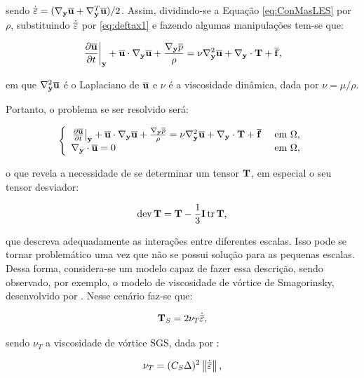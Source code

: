 \documentclass[_ArquivoPrincipal.tex]{subfiles}
\begin{document}
\noindent sendo $\dot{\overline{\mathbf{\varepsilon}}}=(\mathbf{\nabla_y}\overline{\mathbf{u}}+\mathbf{\nabla}^T_\mathbf{y}\overline{\mathbf{u}})/2$. Assim, dividindo-se a Equação \ref{eq:ConMasLES} por $\rho$, substituindo $\dot{\overline{\mathbf{\varepsilon}}}$ por \ref{eq:deftax1} e fazendo algumas manipulações tem-se que:

\begin{equation}
    \left.\frac{\partial{\overline{\mathbf{u}}}}{\partial{t}}\right|_{\mathbf{y}}+\overline{\mathbf{u}}\cdot\mathbf{\nabla_y}\overline{\mathbf{u}}+\frac{\mathbf{\nabla_y} \overline{p}}{\rho}=\nu\mathbf{\nabla}^2_\mathbf{y}\overline{\mathbf{u}}+\mathbf{\nabla_y}\cdot\mathbf{T}+\overline{\mathbf{f}}\text{,}
\end{equation}

\noindent em que $\mathbf{\nabla}^2_\mathbf{y}\overline{\mathbf{u}}$ é o Laplaciano de $\overline{\mathbf{u}}$ e $\nu$ é a viscosidade dinâmica, dada por $\nu=\mu/\rho$.

Portanto, o problema se ser resolvido será:

\begin{equation}
    \left\{
   \begin{array}{ll}
        \left.\frac{\partial{\overline{\mathbf{u}}}}{\partial{t}}\right|_{\mathbf{y}}+\overline{\mathbf{u}}\cdot\mathbf{\nabla_y}\overline{\mathbf{u}}+\frac{\mathbf{\nabla_y} \overline{p}}{\rho}=\nu\mathbf{\nabla}^2_\mathbf{y}\overline{\mathbf{u}}+\mathbf{\nabla_y}\cdot\mathbf{T}+\overline{\mathbf{f}}&\text{ em }\Omega\text{,}\\
        \mathbf{\nabla_y}\cdot\overline{\mathbf{u}}=0&\text{ em }\Omega\text{,}
    \end{array}
    \right.
\end{equation}

\noindent o que revela a necessidade de se determinar um tensor $\mathbf{T}$, em especial o seu tensor desviador:

\begin{equation}
    \mathop{\mathrm{dev}}\nolimits{\mathbf{T}}=\mathbf{T}-\frac{1}{3}\mathbf{I}\mathop{\mathrm{tr}}\nolimits{\mathbf{T}}\text{,}
\end{equation}

\noindent que descreva adequadamente as interações entre diferentes escalas. Isso pode se tornar problemático uma vez que não se possui solução para as pequenas escalas. Dessa forma, considera-se um modelo capaz de fazer essa descrição, sendo observado, por exemplo, o modelo de viscosidade de vórtice de Smagorinsky, desenvolvido por . Nesse cenário faz-se que:

\begin{equation}
    \mathbf{T}_S=2\nu_T\dot{\overline{\mathbf{\varepsilon}}}\text{,}
\end{equation}

\noindent sendo $\nu_T$ a viscosidade de vórtice SGS, dada por \cite{germano1991dynamic,piomelli1999large,hughes2000large}:

\begin{equation}
    \nu_T=(C_S\Delta)^2\left\lVert{\dot{\overline{\mathbf{\varepsilon}}}}\right\lVert\text{,}
\end{equation}
\end{document}
